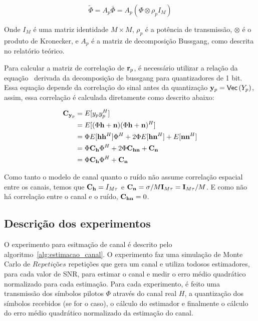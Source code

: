 \documentclass{article}
\begin{document}
\begin{equation}
    \tilde{\Phi}=A_p\bar{\Phi}=A_p(\Phi\otimes\rho_pI_M)
    \label{eq:calculo_phi}
\end{equation}

Onde $I_M$ é uma matriz identidade $M\times M$, $\rho_p$ é a potência de transmissão, $\otimes$ é o produto de Kronecker, e $A_p$ é a matriz de decomposição Bussgang, como descrita no relatório teórico.

Para calcular a matriz de correlação de $\mathbf{r}_p$, é necessário utilizar a relação da equação~\cite[eq. (13)]{li.etal_2017a} derivada da decomposição de bussgang para quantizadores de 1 bit. Essa equação depende da correlação do sinal antes da quantização $\mathbf{y}_p= \mathsf{Vec} \left( Y_p \right) $, assim, essa correlação é calculada diretamente como descrito abaixo:

\begin{align}
    \label{eq:calculo_correlacao_yp}
    \mathbf{C}_{\mathbf{y}_p}   &= E[y_py_p^H] \\ \nonumber
                    &= E[(\Phi \mathbf{h} + \mathbf{n})(\Phi \mathbf{h} + \mathbf{n})^H] \\ \nonumber 
                    &= \Phi E[\mathbf{h} \mathbf{h}^H] \Phi^H + 2\Phi E[\mathbf{h}\mathbf{n}^H] + E[\mathbf{n}\mathbf{n}^H] \\ \nonumber 
                    &= \Phi \mathbf{C}_{\mathbf{h}} \Phi^H + 2\Phi\mathbf{C}_{\mathbf{h}\mathbf{n}} + \mathbf{C}_{\mathbf{n}} \\ \nonumber 
                    &= \Phi \mathbf{C}_{\mathbf{h}} \Phi^H + \mathbf{C}_{\mathbf{n}}
\end{align}

Como tanto o modelo de canal quanto o ruído não assume correlação espacial entre os canais, temos que $\mathbf{C}_{\mathbf{h}}=I_{M\tau}$ e $\mathbf{C}_{\mathbf{n}}=\sigma/M \mathbf{I}_{M\tau}=\mathbf{I}_{M\tau}/M$. E como não há correlação entre o canal e o ruído, $\mathbf{C}_{\mathbf{h}\mathbf{n}}=0$.

\subsection{Descrição dos experimentos}

O experimento para esitmação de canal é descrito pelo algoritmo~\ref{alg:estimacao_canal}. O experimento faz uma simulação de Monte Carlo de $Repetições$ repetições que gera um canal e utiliza todosos estimadores, para cada valor de SNR, para estimar o canal e medir o erro médio quadrático normalizado para cada estimação. Para cada experimento, é feito uma transmissão dos símbolos pilotos $\Phi$ através do canal real $H$, a quantização dos símbolos recebidos (se for o caso), o cálculo do estimador e finalmente o cálculo do erro médio quadrático normalizado da estimação do canal.
\end{document}
